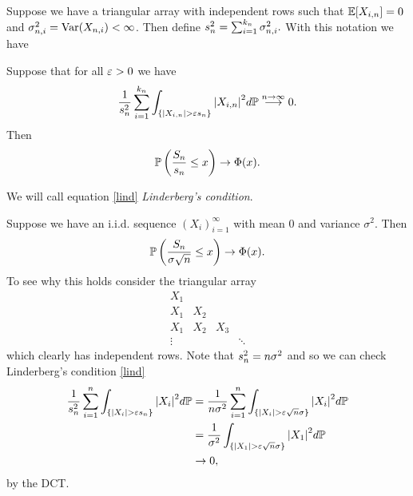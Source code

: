 Suppose we have a triangular array with independent rows such that ${\mathbb{E}}[X_{i,n}]=0$ and  $\sigma_{n,i}^2 = \operatorname{Var}(X_{n,i}) < \infty$. Then define $s_n^2 = \sum_{i=1}^{k_n}\sigma_{n,i}^2.$ With this notation we have
\begin{thrm}[Linderberg]
    Suppose that for all $\varepsilon > 0$ we have 
    \begin{equation}\label{lind}\frac{1}{s_n^2}\sum_{i=1}^{k_n}\int_{\{{\left\lvert X_{i,n}\right\rvert} > \varepsilon s_n\}}{\left\lvert X_{i,n}\right\rvert}^2d{\mathbb{P}} \stackrel{n \to \infty}{\longrightarrow} 0. 
    \end{equation}
    Then 
    \[{\mathbb{P}}\left(\frac{S_n}{s_n} \le x\right)\to \Phi(x). \]
\end{thrm}
We will call equation \eqref{lind} \emph{Linderberg's condition}.
\begin{ex}
    Suppose we have an i.i.d. sequence $(X_i)_{i =1}^\infty$ with mean 0 and variance $\sigma^2$. Then 
    \[{\mathbb{P}}\left(\frac{S_n}{\sigma\sqrt{n}} \le x\right)\to \Phi(x). \]
    To see why this holds consider the triangular array 
    \[\begin{matrix}
        X_1\\X_1&X_2\\X_1&X_2&X_3\\ \vdots &&&\ddots
    \end{matrix}\]
    which clearly has independent rows. Note that $s_n^2 = n \sigma^2$ and so we can check Linderberg's condition \eqref{lind}
    \begin{align*}
        \frac{1}{s_n^2}\sum_{i=1}^n \int_{\{{\left\lvert X_i\right\rvert} > \varepsilon s_n\}}{\left\lvert X_{i}\right\rvert}^2d{\mathbb{P}}&=\frac{1}{n \sigma^2}\sum_{i=1}^n \int_{\{{\left\lvert X_i\right\rvert} > \varepsilon\sqrt{n} \sigma\}}{\left\lvert X_{i}\right\rvert}^2d{\mathbb{P}}\\
        &= \frac{1}{\sigma^2}\int_{\{{\left\lvert X_1\right\rvert} > \varepsilon \sqrt{n}\sigma\}}{\left\lvert X_1\right\rvert}^2d{\mathbb{P}}\\
        &\to 0,
    \end{align*}
    by the DCT. 
\end{ex}
